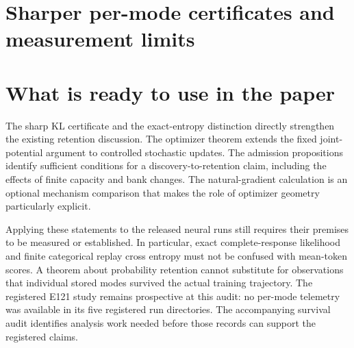 \documentclass[11pt]{article}
\begin{document}


\section{Sharper per-mode certificates and measurement limits}
\label{sec:survival}




\section{What is ready to use in the paper}
The sharp KL certificate and the exact-entropy distinction directly strengthen
the existing retention discussion. The optimizer theorem extends the fixed
joint-potential argument to controlled stochastic updates. The admission
propositions identify sufficient conditions for a discovery-to-retention
claim, including the effects of finite capacity and bank changes.
The natural-gradient calculation is an optional mechanism comparison that
makes the role of optimizer geometry particularly explicit.

Applying these statements to the released neural runs still requires their
premises to be measured or established. In particular, exact complete-response
likelihood and finite categorical replay cross entropy must not be confused
with mean-token scores. A theorem about probability retention cannot substitute
for observations that individual stored modes survived the actual training
trajectory. The registered E121 study remains prospective at this audit:
no per-mode telemetry was available in its five registered run directories.
The accompanying survival audit identifies analysis work needed before those
records can support the registered claims.
\end{document}
